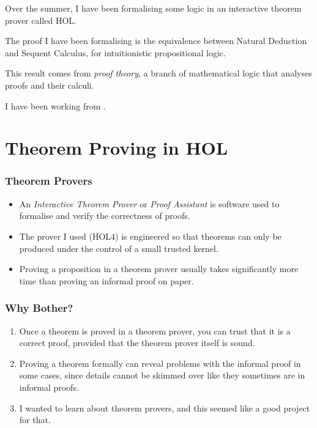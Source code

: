 \documentclass[english,svgnames,hide notes,12pt]{beamer}
\title{\large\presentationtitle}
\author{Alexander Cox\\
		\small Supervised by Michael Norrish\\
		\small The Australian National University
	}
\date{\today}
\theoremstyle{definition}
\theoremstyle{remark}
\begin{document}
\thispagestyle{empty}
\begin{frame}
    \titlepage{}
\end{frame}

\begin{frame}
    Over the summer, I have been formalising some logic in an interactive theorem prover called HOL. 

    \bigskip
    The proof I have been formalising is the equivalence between Natural Deduction and Sequent Calculus, for intuitionistic propositional logic.

    \bigskip
    This result comes from \emph{proof theory}, a branch of mathematical logic that analyses proofs and their calculi.

    \bigskip
    I have been working from .
\end{frame}

\section{Theorem Proving in HOL}

\begin{frame}
    \frametitle{Theorem Provers}
    \begin{itemize}
        \item An \emph{Interactive Theorem Prover} or \emph{Proof Assistant} is software used to formalise and verify the correctness of proofs.
        \item The prover I used (HOL4) is engineered so that theorems can only be produced under the control of a small trusted kernel.
        \item Proving a proposition in a theorem prover usually takes significantly more time than proving an informal proof on paper.
    \end{itemize}
\end{frame}

\begin{frame}
    \frametitle{Why Bother?}
    \begin{enumerate}
        \item Once a theorem is proved in a theorem prover, you can trust that it is a correct proof, provided that the theorem prover itself is sound.
        \item Proving a theorem formally can reveal problems with the informal proof in some cases, since details cannot be skimmed over like they sometimes are in informal proofs.
        \item I wanted to learn about theorem provers, and this seemed like a good project for that.
    \end{enumerate}
\end{frame}
\end{document}
